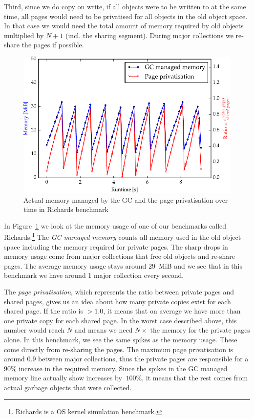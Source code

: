 \documentclass{sigplanconf}
\begin{document}
Third, since we do copy on write, if all objects were to be written to
at the same time, all pages would need to be privatised for all
objects in the old object space. In that case we would need the total
amount of memory required by old objects multiplied by $N+1$
(incl. the sharing segment). During major collections we re-share the
pages if possible.

\begin{figure}[h]
  \centering
  \includegraphics[width=1\columnwidth]{plots/richards_mem.pdf}
  \caption{Actual memory managed by the GC and the page privatisation
    over time in Richards benchmark\label{fig:richards_mem}}
\end{figure}

In Figure~\ref{fig:richards_mem} we look at the memory usage of one of
our benchmarks called Richards.\footnote{Richards is a OS kernel simulation
benchmark.} The \emph{GC managed memory} counts all memory used in the
old object space including the memory required for private pages. The
sharp drops in memory usage come from major collections that free old
objects and re-share pages. The average memory usage stays around
29~MiB and we see that in this benchmark we have around 1 major
collection every second.

The \emph{page privatisation}, which represents the ratio between
private pages and shared pages, gives us an idea about how many
private copies exist for each shared page. If the ratio is $>1.0$, it
means that on average we have more than one private copy for each
shared page. In the worst case described above, this number would
reach $N$ and means we need $N\times$ the memory for the private
pages alone. In this benchmark, we see the same spikes as the memory
usage. These come directly from re-sharing the pages. The maximum page
privatisation is around $0.9$ between major collections, thus the
private pages are responsible for a $90\%$ increase in the required
memory. Since the spikes in the GC managed memory line actually
show increases by $~100\%$, it means that the rest comes from actual
garbage objects that were collected.
\end{document}
